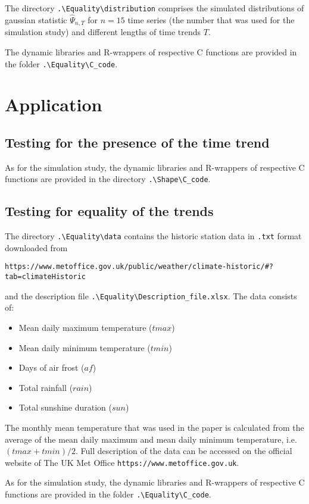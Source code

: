\documentclass[a4paper,12pt]{article}
\begin{document}
The directory \verb|.\Equality\distribution| comprises the simulated distributions of gaussian statistic $\widehat{\Psi}_{n, T}$ for $n= 15$ time series (the number that was used for the simulation study) and different lengths of time trends $T$. 

The dynamic libraries and R-wrappers of respective C functions are provided in the folder \verb|.\Equality\C_code|. 

\section{Application}
\subsection{Testing for the presence of the time trend}

As for the simulation study, the dynamic libraries and R-wrappers of respective C functions are provided in the directory \verb|.\Shape\C_code|. 

\subsection{Testing for equality of the trends}
The directory \verb|.\Equality\data| contains the historic station data in \verb|.txt| format downloaded from 
\begin{verbatim}
https://www.metoffice.gov.uk/public/weather/climate-historic/#?tab=climateHistoric
\end{verbatim}
and the description file \verb|.\Equality\Description_file.xlsx|. The data consists of:
\begin{itemize}
\item Mean daily maximum temperature ($tmax$)
\item Mean daily minimum temperature ($tmin$)
\item Days of air frost ($af$)
\item Total rainfall ($rain$)
\item Total sunshine duration ($sun$)
\end{itemize}
The monthly mean temperature that was used in the paper is calculated from the average of the mean daily maximum and mean daily minimum temperature, i.e.\ $(tmax+tmin)/2$. Full description of the data can be accessed on the official website of The UK Met Office \verb|https://www.metoffice.gov.uk|. 

As for the simulation study, the dynamic libraries and R-wrappers of respective C functions are provided in the folder \verb|.\Equality\C_code|. 


\renewcommand{\baselinestretch}{1.2}\normalsize
{}
\allowdisplaybreaks[1]
\end{document}
